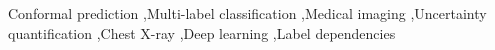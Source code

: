 \begin{keyword}
Conformal prediction \sep Multi-label classification \sep Medical imaging \sep Uncertainty quantification \sep Chest X-ray \sep Deep learning \sep Label dependencies
\end{keyword}

